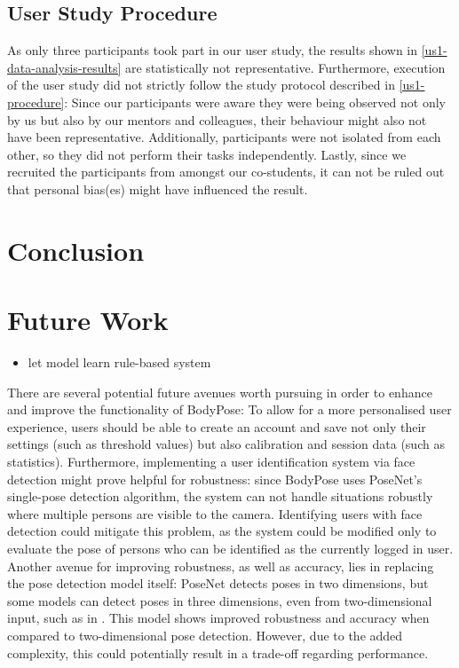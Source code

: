 \subsection{User Study Procedure}
As only three participants took part in our user study, the results shown in \ref{us1-data-analysis-results} are statistically not representative. Furthermore, execution of the user study did not strictly follow the study protocol described in \ref{us1-procedure}: Since our participants were aware they were being observed not only by us but also by our mentors and colleagues, their behaviour might also not have been representative. Additionally, participants were not isolated from each other, so they did not perform their tasks independently. Lastly, since we recruited the participants from amongst our co-students, it can not be ruled out that personal bias(es) might have influenced the result.


\section{Conclusion} %
\label{conclusion}

\section{Future Work}
\begin{itemize}
    \item let model learn rule-based system
\end{itemize}
There are several potential future avenues worth pursuing in order to enhance and improve the functionality of BodyPose: To allow for a more personalised user experience, users should be able to create an account and save not only their settings (such as threshold values) but also calibration and session data (such as statistics). Furthermore, implementing a user identification system via face detection might prove helpful for robustness: since BodyPose uses PoseNet's single-pose detection algorithm, the system can not handle situations robustly where multiple persons are visible to the camera. Identifying users with face detection could mitigate this problem, as the system could be modified only to evaluate the pose of persons who can be identified as the currently logged in user. Another avenue for improving robustness, as well as accuracy, lies in replacing the pose detection model itself: PoseNet detects poses in two dimensions, but some models can detect poses in three dimensions, even from two-dimensional input, such as in \cite{Arnab_2019}. This model shows improved robustness and accuracy when compared to two-dimensional pose detection. However, due to the added complexity, this could potentially result in a trade-off regarding performance.

